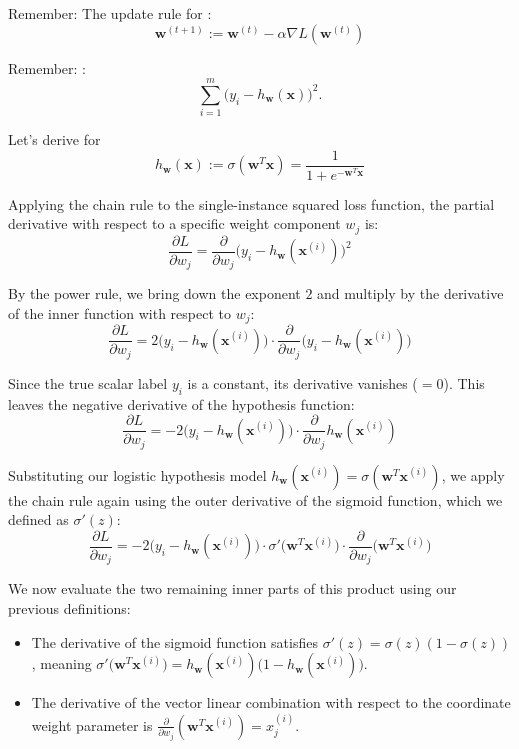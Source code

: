 
Remember: The update rule for :
\[
\mathbf{w}^{(t+1)} := \mathbf{w}^{(t)} - \alpha \nabla L(\mathbf{w}^{(t)})
\]

Remember: :
\[
\sum_{i=1}^{m} \big(y_i-h_{\mathbf{w}}(\mathbf{x})\big)^2.
\]

Let's derive  for 
\[
h_{\mathbf{w}}(\mathbf{x}) := \sigma(\mathbf{w}^T\mathbf{x}) = \frac{1}{1 + e^{-\mathbf{w}^T\mathbf{x}}}
\]

Applying the chain rule to the single-instance squared loss function, the partial derivative with respect to a specific weight component $w_j$ is:
\[
\frac{\partial L}{\partial w_j} = \frac{\partial}{\partial w_j} \big(y_i - h_{\mathbf{w}}(\mathbf{x}^{(i)})\big)^2
\]

By the power rule, we bring down the exponent $2$ and multiply by the derivative of the inner function with respect to $w_j$:
\[
\frac{\partial L}{\partial w_j} = 2\big(y_i - h_{\mathbf{w}}(\mathbf{x}^{(i)})\big) \cdot \frac{\partial}{\partial w_j}\big(y_i - h_{\mathbf{w}}(\mathbf{x}^{(i)})\big)
\]

Since the true scalar label $y_i$ is a constant, its derivative vanishes ($=0$). This leaves the negative derivative of the hypothesis function:
\[
\frac{\partial L}{\partial w_j} = -2\big(y_i - h_{\mathbf{w}}(\mathbf{x}^{(i)})\big) \cdot \frac{\partial}{\partial w_j} h_{\mathbf{w}}(\mathbf{x}^{(i)})
\]

Substituting our logistic hypothesis model $h_{\mathbf{w}}(\mathbf{x}^{(i)}) = \sigma(\mathbf{w}^T\mathbf{x}^{(i)})$, we apply the chain rule again using the outer derivative of the sigmoid function, which we defined as $\sigma'(z)$:
\[
\frac{\partial L}{\partial w_j} = -2\big(y_i - h_{\mathbf{w}}(\mathbf{x}^{(i)})\big) \cdot \sigma'\big(\mathbf{w}^T\mathbf{x}^{(i)}\big) \cdot \frac{\partial}{\partial w_j}\big(\mathbf{w}^T\mathbf{x}^{(i)}\big)
\]

We now evaluate the two remaining inner parts of this product using our previous definitions:
\begin{itemize}
    \item The derivative of the sigmoid function satisfies $\sigma'(z) = \sigma(z)(1 - \sigma(z))$, meaning $\sigma'\big(\mathbf{w}^T\mathbf{x}^{(i)}\big) = h_{\mathbf{w}}(\mathbf{x}^{(i)})\big(1 - h_{\mathbf{w}}(\mathbf{x}^{(i)})\big)$.
    \item The derivative of the vector linear combination with respect to the coordinate weight parameter is $\frac{\partial}{\partial w_j}(\mathbf{w}^T\mathbf{x}^{(i)}) = x_j^{(i)}$.
\end{itemize}

